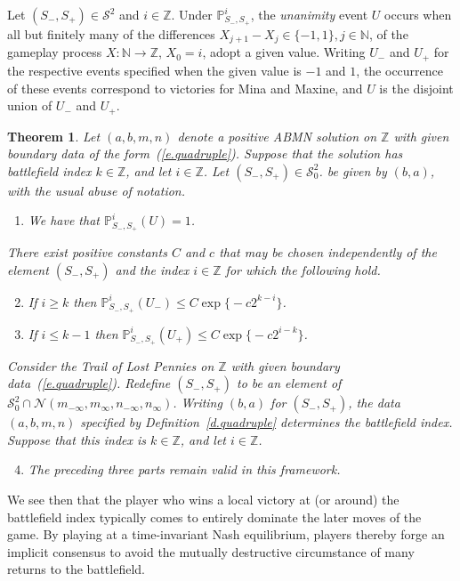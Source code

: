 \documentclass[letterpaper,11pt,oneside,reqno]{amsbook}
\newcommand{\PP}{\ensuremath{\mathbb{P}}}
\newcommand{\N}{\ensuremath{\mathbb{N}}}
\newcommand{\Z}{\ensuremath{\mathbb{Z}}}
\newtheorem{theorem}{Theorem}[chapter]
\numberwithin{figure}{chapter}
\theoremstyle{definition}
\theoremstyle{definition}
\theoremstyle{definition}
\theoremstyle{definition}
\theoremstyle{definition}
\newcommand{\mc}{\mathcal}
\newcommand{\nwithzero}{\N}
\newcommand{\tis}{\mc{S}_0}
\newcommand{\abmnmacspace}{\textrm{ABMN} }
\begin{document}
 
 Let $(S_-,S_+) \in \mc{S}^2$ and $i \in \Z$. Under $\PP_{S_-,S_+}^i$,
 the {\em unanimity} event $U$ occurs when all but finitely many of the differences $X_{j+1} - X_j \in \{-1,1\},  j \in \nwithzero$,
 of the gameplay process $X:\N \to \Z$, $X_0 = i$,
 adopt a given value. Writing $U_-$ and $U_+$ for the respective events specified when the given value is $-1$ and $1$,
 the occurrence of these events correspond to victories for Mina and Maxine, and $U$ is the disjoint union of $U_-$ and $U_+$.
 \begin{theorem}\label{t.unanimity} 
 Let $(a,b,m,n)$ denote a positive \abmnmacspace solution on $\Z$ with given boundary data of the form~(\ref{e.quadruple}).
 Suppose that the solution has  battlefield index $k \in \Z$, and let $i \in \Z$.
 Let $(S_-,S_+) \in \tis^2$.
 be given by $(b,a)$, with the usual abuse of notation. 
 \begin{enumerate}
 \item We have that $\PP_{S_-,S_+}^i(U) = 1$.
 \end{enumerate}
 There exist positive constants $C$ and $c$ that may be chosen independently of the element $(S_-,S_+)$
 and the index $i \in \Z$ for which the following hold.
 \begin{enumerate}
 \setcounter{enumi}{1}
 \item If $i \geq k$ 
 then 
 $\PP_{S_-,S_+}^i(U_-) \leq C \exp \big\{- c 2^{k-i}\big\}$.
 \item If $i \leq k - 1$ then $\PP_{S_-,S_+}^i(U_+) \leq C \exp \big\{- c 2^{i-k}\big\}$.
  \end{enumerate}  
 Consider the Trail of Lost Pennies on $\Z$ with given boundary data~(\ref{e.quadruple}).
 Redefine $(S_-,S_+)$ to be an element of $\mc{S}_0^2 \cap \mc{N}(m_{-\infty},m_\infty,n_{-\infty},n_\infty)$. Writing $(b,a)$ for $(S_-,S_+)$,
 the data $(a,b,m,n)$ specified by Definition~\ref{d.quadruple}
 determines the  battlefield index. Suppose that this index is $k \in \Z$, and let $i \in \Z$.
 \begin{enumerate}
 \setcounter{enumi}{3}
 \item
 The preceding three parts remain valid in this framework. 
\end{enumerate}
 \end{theorem}   
 We see then that the player who wins a local victory at (or around) the battlefield index typically comes to entirely dominate the later moves of the game. By playing at a time-invariant Nash equilibrium, players thereby forge an implicit consensus to avoid the mutually destructive circumstance of many returns to the battlefield.
 
\end{document}
